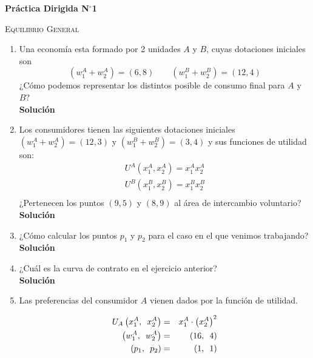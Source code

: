 \documentclass[10pt,a4paper]{article}
\begin{document}
	\begin{center}
		{\Large {\textbf{Práctica Dirigida N$^{\circ}$1}}}

		\textsc{Equilibrio General}
		
	\end{center}
	
\begin{enumerate}
	\item Una economía esta formado por 2 unidades $A$ y $B$, cuyas dotaciones iniciales son
			$$\left(w_{1}^{A}+w_{2}^{A}\right) = \left( 6,8\right) \qquad \left(w_{1}^{B}+w_{2}^{B}\right) = \left(12,4\right)$$
	 	  ¿Cómo podemos representar los distintos posible de consumo final para $A$ y $B$?\\[0.5cm]
			\textbf{\LARGE Solución}\\
				
	\item Los consumidores tienen las siguientes dotaciones iniciales 
		  $\left(w_{1}^{A}+w_{2}^{A}\right) = \left( 12,3\right)$ y 
		  $\left(w_{1}^{B}+w_{2}^{B}\right) = \left( 3,4\right)$ y sus funciones de utilidad son:
			\begin{gather*}
				U^{A}\left(x_{1}^{A},x_{2}^{A}\right)  = x_{1}^{A}x_{2}^{A}\\
				U^{B}\left(x_{1}^{B},x_{2}^{B}\right)  = x_{1}^{B}x_{2}^{B}\\
			\end{gather*}
		 ¿Pertenecen los puntos $\left(9,5 \right)$ y $\left(8,9 \right)$ al área de intercambio voluntario?\\[0.5cm]
			\textbf{\LARGE Solución}\\
				
	\item ¿Cómo calcular los puntos $p_1$ y $p_2$ para el caso en el que venimos  	   trabajando?\\[0.5cm]
			\textbf{\LARGE Solución}\\
				
	\item ¿Cuál es la curva de contrato en el ejercicio anterior?\\[0.5cm]
			\textbf{\LARGE Solución}\\
				
	\item Las preferencias del consumidor $A$ vienen dados por la función de utilidad. \label{Ejercicio_5}
	 	  		\vspace{-0.8cm}
			\begin{multicols}{2}
				\begin{eqnarray*}
					U_{A} \left(x_{1}^{A},\enskip x_{2}^{A} \right) & = & x_{1}^{A}\cdot \left(x_{2}^{A} \right)^{2}\\
					\left( w_{1}^{A},\enskip w_{2}^{A} \right) & = & \left(16,\enskip 4 \right) \\
					\left(p_1,\enskip p_2 \right) & = &\left(1,\enskip 1 \right)
				\end{eqnarray*}
			

\end{multicols}
\end{enumerate}
\end{document}
